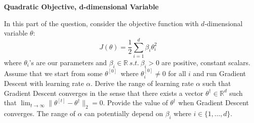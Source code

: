 \item {} {\bf Quadratic Objective, d-dimensional Variable}

In this part of the question, consider the objective function with $d$-dimensional variable $\theta$:
\begin{equation*}
	J(\theta) = \frac{1}{2}\sum_{i=1}^d \beta_i\theta_i^2
\end{equation*}
where $\theta_i$'s are our parameters and $\beta_i\in \mathbb{R}\ s.t.\ \beta_i > 0$ are positive, constant scalars.
Assume that we start from some $\theta^{[0]}$\ where	$\theta_i^{[0]} \neq 0$ for all $i$ and run Gradient Descent with learning rate $\alpha$. Derive the range of learning rate $\alpha$ such that Gradient Descent converges in the sense that there exists a vector $\theta^\dagger\in \mathbb{R}^d$ such that $\lim_{t\to\infty} \|\theta^{[t]}-\theta^\dagger\|_2 = 0$.   Provide the value of $\theta^\dagger$ when Gradient Descent converges. The range of $\alpha$ can potentially depend on $\beta_i$ where $i \in \{1,\dots,d\}$. 
